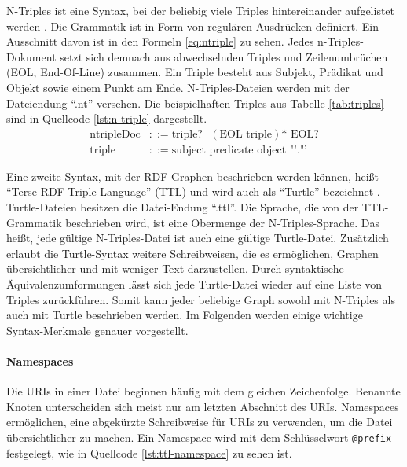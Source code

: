 	N-Triples ist eine Syntax, bei der beliebig viele Triples hintereinander aufgelistet werden \cite[vgl.][]{w3c2014ntriples}. Die Grammatik ist in Form von regulären Ausdrücken definiert. Ein Ausschnitt davon ist in den Formeln \ref{eq:ntriple} zu sehen. Jedes n-Triples-Dokument setzt sich demnach aus abwechselnden Triples und Zeilenumbrüchen (EOL, End-Of-Line) zusammen. Ein Triple besteht aus Subjekt, Prädikat und Objekt sowie einem Punkt am Ende. N-Triples-Dateien werden mit der Dateiendung "`.nt"' versehen. Die beispielhaften Triples aus Tabelle \ref{tab:triples} sind in Quellcode \ref{lst:n-triple} dargestellt.
	\begin{align}
		\text{ntripleDoc} & ::= \text{triple?}\text{ } (\text{EOL triple})\mbox{*} \text{ EOL?} \label{eq:ntriple}\\
		\text{triple} & ::= \text{subject } \text{predicate } \text{object } \text{"'."'} \nonumber
	\end{align}
	
	Eine zweite Syntax, mit der RDF-Graphen beschrieben werden können, heißt "`Terse RDF Triple Language"' (TTL) und wird auch als "`Turtle"' bezeichnet  \cite[vgl.][]{w3c2014turtle}. Turtle-Dateien besitzen die Datei-Endung "`.ttl"'.
	Die Sprache, die von der TTL-Grammatik beschrieben wird, ist eine Obermenge der N-Triples-Sprache. Das heißt, jede gültige N-Triples-Datei ist auch eine gültige Turtle-Datei. Zusätzlich erlaubt die Turtle-Syntax weitere Schreibweisen, die es ermöglichen, Graphen übersichtlicher und mit weniger Text darzustellen. Durch syntaktische Äquivalenzumformungen lässt sich jede Turtle-Datei wieder auf eine Liste von Triples zurückführen. Somit kann jeder beliebige Graph sowohl mit N-Triples als auch mit Turtle beschrieben werden. Im Folgenden werden einige wichtige Syntax-Merkmale genauer vorgestellt.
		\paragraph{Namespaces}
		
		Die URIs in einer Datei beginnen häufig mit dem gleichen Zeichenfolge. Benannte Knoten unterscheiden sich meist nur am letzten Abschnitt des URIs. Namespaces ermöglichen, eine abgekürzte Schreibweise für URIs zu verwenden, um die Datei übersichtlicher zu machen. Ein Namespace wird mit dem Schlüsselwort \lstinline|@prefix| festgelegt, wie in Quellcode \ref{lst:ttl-namespace} zu sehen ist.

